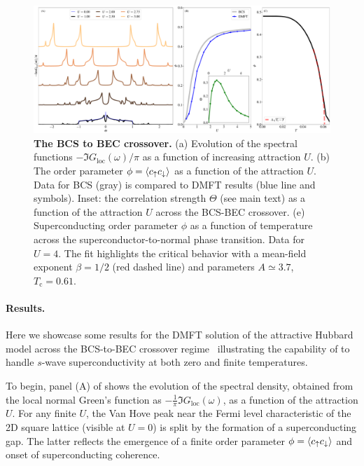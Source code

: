 \documentclass[edipack_sp.tex]{subfiles}
\begin{document}
\begin{figure}[t!]
  \includegraphics[width=\linewidth]{figures/figAHM.pdf}
    \caption{\label{figEx2}%
      \textbf{The BCS to BEC crossover.}
      (a) Evolution of the spectral functions
      $-\Im{G_\mathrm{loc}(\omega)}/\pi$ as a function of increasing
      attraction $U$. 
      (b) The order parameter $\phi=\langle c_\uparrow c_\downarrow\rangle$ as a
      function of the attraction $U$. Data for BCS (gray) is compared
      to DMFT results (blue line and symbols). Inset: the correlation strength
      $\Theta$ (see main text) as a function of the
      attraction $U$ across the BCS-BEC crossover. 
      (e) Superconducting order
      parameter $\phi$ as a function of temperature across the
      superconductor-to-normal phase transition. Data for $U=4$. The
      fit highlights the critical behavior with a mean-field exponent
      $\beta=1/2$ (red dashed line) and parameters $A\simeq 3.7$, $T_\mathrm{c}=0.61$.       
        }
\end{figure}

\paragraph{Results.}
Here we showcase some results for the DMFT solution of the 
attractive Hubbard model across the BCS-to-BEC crossover regime~\cite{Toschi2005PRB,Toschi2005NJP,Amaricci2014PRA} 
illustrating the capability of \NAME to handle $s$-wave 
superconductivity at both zero and finite temperatures.

To begin, panel (A) of  shows the evolution of the 
spectral density, obtained from the local normal Green's function as 
$-\tfrac{1}{\pi}\Im G_\mathrm{loc}(\omega)$, as a function of the 
attraction $U$. For any finite $U$, the Van Hove peak near the Fermi level characteristic of the 2D square lattice (visible at 
$U = 0$) is split by the formation of a superconducting gap. The latter reflects the emergence of a finite 
order parameter $\phi = \langle c_\uparrow c_\downarrow \rangle$ and onset of superconducting coherence.
\end{document}
